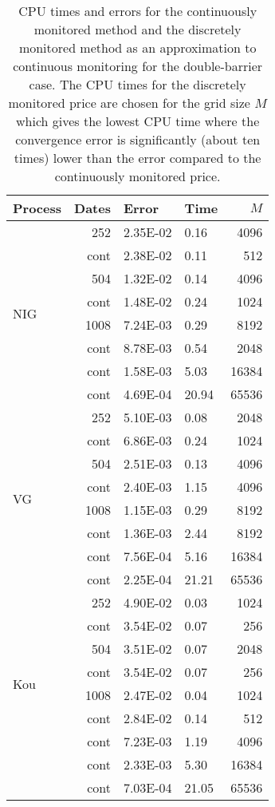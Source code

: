 \documentclass[11pt,a4paper]{article}
\begin{document}
\begin{table}[h]
\centering
\begin{tabular}{lrllr}
\hline\hline
Process & Dates & Error & Time & $M$\\
\hline
\multirow{8}{*}{NIG} & 252 & 2.35E-02 & 0.16 & 4096 \\
& cont & 2.38E-02 & 0.11 & 512\\
\cline{2-5}
& 504 & 1.32E-02 & 0.14 & 4096\\
& cont & 1.48E-02 & 0.24 & 1024\\
\cline{2-5}
& 1008 & 7.24E-03 & 0.29 & 8192\\
& cont & 8.78E-03 & 0.54 & 2048\\
\cline{2-5}
& cont & 1.58E-03 & 5.03 & 16384\\
\cline{2-5}
& cont & 4.69E-04 & 20.94 & 65536\\
\cline{2-5}
\hline
\multirow{8}{*}{VG} & 252 & 5.10E-03 & 0.08 & 2048\\
& cont & 6.86E-03 & 0.24 & 1024\\
\cline{2-5}
& 504 & 2.51E-03 & 0.13 & 4096\\
& cont & 2.40E-03 & 1.15& 4096\\
\cline{2-5}
& 1008 & 1.15E-03 & 0.29 & 8192\\
& cont & 1.36E-03 & 2.44 & 8192\\
\cline{2-5}
& cont & 7.56E-04 & 5.16 & 16384\\
\cline{2-5}
& cont & 2.25E-04 & 21.21 & 65536\\
\hline
\multirow{8}{*}{Kou} & 252 & 4.90E-02 & 0.03 & 1024\\
& cont & 3.54E-02 & 0.07 & 256\\
\cline{2-5}
& 504 & 3.51E-02 & 0.07 & 2048\\
& cont & 3.54E-02 & 0.07 & 256\\
\cline{2-5}
& 1008 & 2.47E-02 & 0.04 & 1024\\
& cont & 2.84E-02 & 0.14& 512\\
\cline{2-5}
& cont & 7.23E-03 & 1.19 & 4096\\
\cline{2-5}
& cont & 2.33E-03 & 5.30 & 16384\\
\cline{2-5}
& cont & 7.03E-04 & 21.05 & 65536\\
\hline\hline
\end{tabular}
\caption{CPU times and errors for the continuously monitored method and the discretely monitored method as an approximation to continuous monitoring for the double-barrier case. The CPU times for the discretely monitored price are chosen for the grid size $M$ which gives the lowest CPU time where the convergence error is significantly (about ten times) lower than the error compared to the continuously monitored price.}
\label{tab:DouberrvCPUcomparison}
\end{table}
\end{document}
